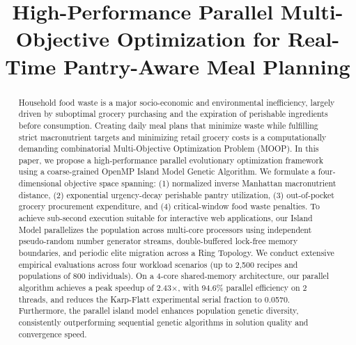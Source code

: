 ﻿\documentclass[conference]{IEEEtran}
\begin{document}
\title{High-Performance Parallel Multi-Objective Optimization for Real-Time Pantry-Aware Meal Planning}

\author{
\and
{}
}

\maketitle

\begin{abstract}
Household food waste is a major socio-economic and environmental inefficiency, largely driven by suboptimal grocery purchasing and the expiration of perishable ingredients before consumption. Creating daily meal plans that minimize waste while fulfilling strict macronutrient targets and minimizing retail grocery costs is a computationally demanding combinatorial Multi-Objective Optimization Problem (MOOP). In this paper, we propose a high-performance parallel evolutionary optimization framework using a coarse-grained OpenMP Island Model Genetic Algorithm. We formulate a four-dimensional objective space spanning: (1) normalized inverse Manhattan macronutrient distance, (2) exponential urgency-decay perishable pantry utilization, (3) out-of-pocket grocery procurement expenditure, and (4) critical-window food waste penalties. To achieve sub-second execution suitable for interactive web applications, our Island Model parallelizes the population across multi-core processors using independent pseudo-random number generator streams, double-buffered lock-free memory boundaries, and periodic elite migration across a Ring Topology. We conduct extensive empirical evaluations across four workload scenarios (up to 2,500 recipes and populations of 800 individuals). On a 4-core shared-memory architecture, our parallel algorithm achieves a peak speedup of 2.43$\times$, with 94.6\% parallel efficiency on 2 threads, and reduces the Karp-Flatt experimental serial fraction to 0.0570. Furthermore, the parallel island model enhances population genetic diversity, consistently outperforming sequential genetic algorithms in solution quality and convergence speed.
\end{abstract}
\end{document}
